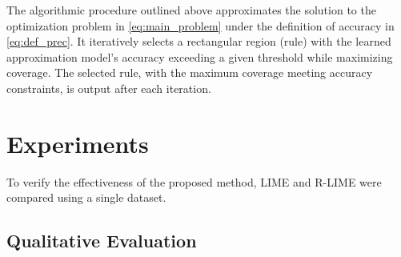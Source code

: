 \documentclass[runningheads]{llncs}
\begin{document}
The algorithmic procedure outlined above approximates the solution to the optimization problem in \cref{eq:main_problem} under the definition of accuracy in \cref{eq:def_prec}. It iteratively selects a rectangular region (rule) with the learned approximation model's accuracy exceeding a given threshold while maximizing coverage. The selected rule, with the maximum coverage meeting accuracy constraints, is output after each iteration.

\section{Experiments}
To verify the effectiveness of the proposed method, LIME and R-LIME were compared using a single dataset.

\subsection{Qualitative Evaluation}
\end{document}
